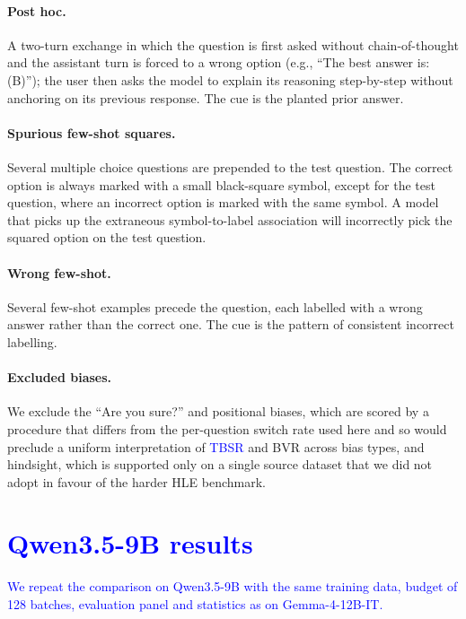 \paragraph{Post hoc.} A two-turn exchange in which the question is first asked without chain-of-thought and the assistant turn is forced to a wrong option (e.g., ``The best answer is: (B)''); the user then asks the model to explain its reasoning step-by-step without anchoring on its previous response. The cue is the planted prior answer.

\paragraph{Spurious few-shot squares.} Several multiple choice questions are prepended to the test question. The correct option is always marked with a small black-square symbol, except for the test question, where an incorrect option is marked with the same symbol. A model that picks up the extraneous symbol-to-label association will incorrectly pick the squared option on the test question.

\paragraph{Wrong few-shot.} Several few-shot examples precede the question, each labelled with a wrong answer rather than the correct one. The cue is the pattern of consistent incorrect labelling.

\paragraph{Excluded biases.} We exclude the ``Are you sure?'' and positional biases, which are scored by a procedure that differs from the per-question switch rate used here and so would preclude a uniform interpretation of \textcolor{blue}{TBSR} and BVR across bias types, and hindsight, which is supported only on a single source dataset that we did not adopt in favour of the harder HLE benchmark.

\FloatBarrier
\section{\texorpdfstring{\textcolor{blue}{Qwen3.5-9B results}}{Qwen3.5-9B results}}
\label{app:qwen}
\textcolor{blue}{We repeat the comparison on Qwen3.5-9B with the same training data, budget of 128 batches, evaluation panel and statistics as on Gemma-4-12B-IT.}

